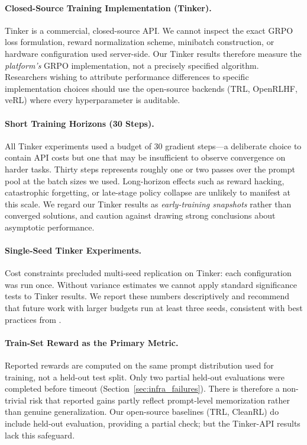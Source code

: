 \paragraph{Closed-Source Training Implementation (Tinker).}
Tinker is a commercial, closed-source API. We cannot inspect the exact GRPO
loss formulation, reward normalization scheme, minibatch construction, or
hardware configuration used server-side. Our Tinker results therefore measure
the \emph{platform's} GRPO implementation, not a precisely specified algorithm.
Researchers wishing to attribute performance differences to specific
implementation choices should use the open-source backends (TRL, OpenRLHF,
veRL) where every hyperparameter is auditable.

\paragraph{Short Training Horizons (30 Steps).}
All Tinker experiments used a budget of 30 gradient steps---a deliberate choice
to contain API costs but one that may be insufficient to observe convergence
on harder tasks. Thirty steps represents roughly one or two passes over the
prompt pool at the batch sizes we used. Long-horizon effects such as reward
hacking, catastrophic forgetting, or late-stage policy collapse are unlikely
to manifest at this scale. We regard our Tinker results as \emph{early-training
snapshots} rather than converged solutions, and caution against drawing strong
conclusions about asymptotic performance.

\paragraph{Single-Seed Tinker Experiments.}
Cost constraints precluded multi-seed replication on Tinker: each configuration
was run once. Without variance estimates we cannot apply standard significance
tests to Tinker results. We report these numbers descriptively and recommend
that future work with larger budgets run at least three seeds, consistent with
best practices from \citet{henderson2018deep}.

\paragraph{Train-Set Reward as the Primary Metric.}
Reported rewards are computed on the same prompt distribution used for
training, not a held-out test split. Only two partial held-out evaluations
were completed before timeout (Section~\ref{sec:infra_failures}). There is
therefore a non-trivial risk that reported gains partly reflect prompt-level
memorization rather than genuine generalization. Our open-source baselines
(TRL, CleanRL) do include held-out evaluation, providing a partial check;
but the Tinker-API results lack this safeguard.

